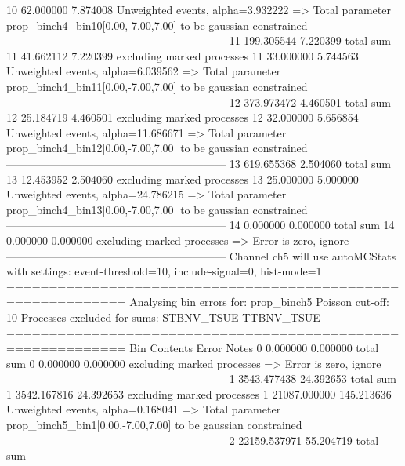 10         62.000000       7.874008        Unweighted events, alpha=3.932222
  => Total parameter prop_binch4_bin10[0.00,-7.00,7.00] to be gaussian constrained
------------------------------------------------------------
11         199.305544      7.220399        total sum                     
11         41.662112       7.220399        excluding marked processes    
11         33.000000       5.744563        Unweighted events, alpha=6.039562
  => Total parameter prop_binch4_bin11[0.00,-7.00,7.00] to be gaussian constrained
------------------------------------------------------------
12         373.973472      4.460501        total sum                     
12         25.184719       4.460501        excluding marked processes    
12         32.000000       5.656854        Unweighted events, alpha=11.686671
  => Total parameter prop_binch4_bin12[0.00,-7.00,7.00] to be gaussian constrained
------------------------------------------------------------
13         619.655368      2.504060        total sum                     
13         12.453952       2.504060        excluding marked processes    
13         25.000000       5.000000        Unweighted events, alpha=24.786215
  => Total parameter prop_binch4_bin13[0.00,-7.00,7.00] to be gaussian constrained
------------------------------------------------------------
14         0.000000        0.000000        total sum                     
14         0.000000        0.000000        excluding marked processes    
  => Error is zero, ignore      
------------------------------------------------------------
Channel ch5 will use autoMCStats with settings: event-threshold=10, include-signal=0, hist-mode=1
============================================================
Analysing bin errors for: prop_binch5
Poisson cut-off: 10
Processes excluded for sums: STBNV_TSUE TTBNV_TSUE
============================================================
Bin        Contents        Error           Notes                         
0          0.000000        0.000000        total sum                     
0          0.000000        0.000000        excluding marked processes    
  => Error is zero, ignore      
------------------------------------------------------------
1          3543.477438     24.392653       total sum                     
1          3542.167816     24.392653       excluding marked processes    
1          21087.000000    145.213636      Unweighted events, alpha=0.168041
  => Total parameter prop_binch5_bin1[0.00,-7.00,7.00] to be gaussian constrained
------------------------------------------------------------
2          22159.537971    55.204719       total sum                     
